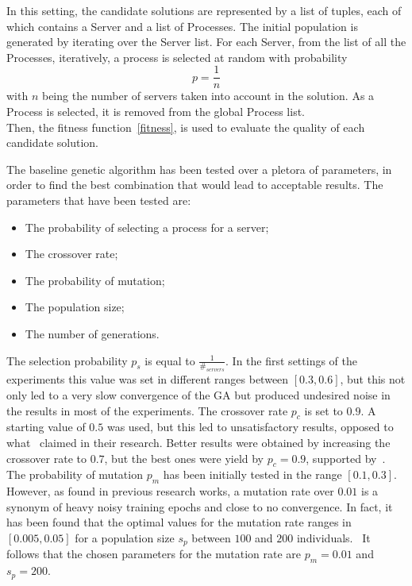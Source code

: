 In this setting, the candidate solutions are represented by a list of tuples, each of which contains a Server and a list of Processes.
The initial population is generated by iterating over the Server list. 
For each Server, from the list of all the Processes, iteratively, a process is selected at random with probability $$p = \frac{1}{n}$$
with $n$ being the number of servers taken into account in the solution. As a Process is selected, it is removed from the global Process list.\\

Then, the fitness function~\eqref{fitness}, is used to evaluate the quality of each candidate solution.

The baseline genetic algorithm has been tested over a pletora of parameters, in order to find the best combination that would lead to acceptable results.
The parameters that have been tested are:
\begin{itemize}
    \item The probability of selecting a process for a server;
    \item The crossover rate;
    \item The probability of mutation;
    \item The population size;
    \item The number of generations.
\end{itemize}

The selection probability $p_s$ is equal to $\frac{1}{\#_{servers}}$. In the first settings of the experiments this value was 
set in different ranges between $[0.3, 0.6]$, but this not only led to a very slow convergence of the GA but produced undesired noise
in the results in most of the experiments.
The crossover rate $p_c$ is set to $0.9$. A starting value of $0.5$ was used, but this led to unsatisfactory results, opposed to what~\cite{mirjalili2019genetic} claimed
in their research.
Better results were obtained by increasing the crossover rate to $0.7$, but the best ones were yield by $p_c = 0.9$, supported by~\cite{hassanat2019choosing}.
The probability of mutation $p_m$ has been initially tested in the range $[0.1, 0.3]$. However, as found in previous research works,
a mutation rate over $0.01$ is a synonym of heavy noisy training epochs and close to no convergence. In fact, it has been found that 
the optimal values for the mutation rate ranges in $[0.005, 0.05]$ for a population size $s_p$ between $100$ and $200$ individuals.~\cite{patil2015optimal}
It follows that the chosen parameters for the mutation rate are $p_m = 0.01$ and $s_p = 200$.

